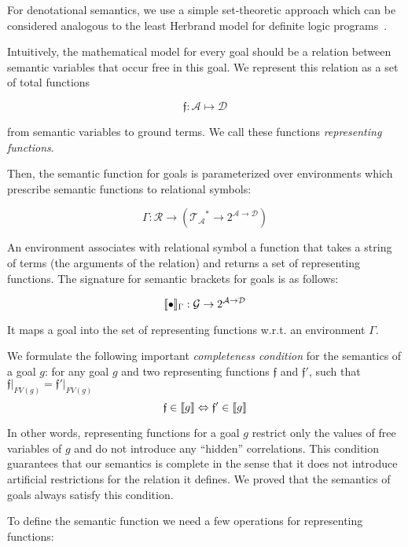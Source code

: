 For denotational semantics, we use a simple set-theoretic approach which can be considered analogous to the least Herbrand model for definite logic programs~\cite{LHM}.

Intuitively, the mathematical model for every goal should be a relation between semantic variables that occur free in this goal. We represent this relation as a set of total
functions 

\[
\mathfrak{f}:\mathcal{A}\mapsto\mathcal{D}
\]

from semantic variables to ground terms. We call these functions \emph{representing functions}.

Then, the semantic function for goals is parameterized over environments which prescribe semantic functions to relational symbols:

\[
  \Gamma : \mathcal{R} \to (\mathcal{T_A}^*\to 2^{\mathcal{A}\to\mathcal{D}})
\]

An environment associates with relational symbol a function that takes a string of terms (the arguments of the relation) and returns a set of
representing functions. The signature for semantic brackets for goals is as follows:

\[
\llbracket{\bullet}\rrbracket_{\Gamma} : \mathcal{G}\to 2^{\mathcal{A}\to\mathcal{D}}
\]

It maps a goal into the set of representing functions w.r.t. an environment $\Gamma$.

We formulate the following important \emph{completeness condition} for the semantics of a goal $g$: for any goal $g$ and two representing functions ${\mathfrak f}$ and ${\mathfrak f'}$, such that $\left.{\mathfrak f}\right|_{FV(g)} = \left.{\mathfrak f'}\right|_{FV(g)}$
\[ {\mathfrak f} \in \llbracket{g}\rrbracket \Leftrightarrow {\mathfrak f'} \in \llbracket{g}\rrbracket \]

In other words, representing functions for a goal $g$ restrict only the values of free variables of $g$ and do not introduce any ``hidden'' correlations.
This condition guarantees that our semantics is complete in the sense that it does not introduce artificial restrictions for the relation it defines.
We proved that the semantics of goals always satisfy this condition.

To define the semantic function we need a few operations for representing functions:

